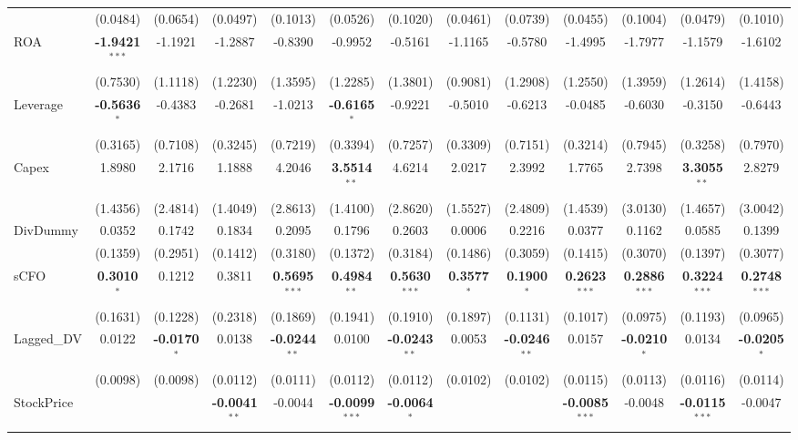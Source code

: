 \begin{landscape}
\begin{table}[H]
\begin{tabular}{lcccccccccccc}
 & (0.0484) & (0.0654) & (0.0497) & (0.1013) & (0.0526) & (0.1020) & (0.0461) & (0.0739) & (0.0455) & (0.1004) & (0.0479) & (0.1010) \\
ROA & \textbf{-1.9421}$^{***}$ & -1.1921 & -1.2887 & -0.8390 & -0.9952 & -0.5161 & -1.1165 & -0.5780 & -1.4995 & -1.7977 & -1.1579 & -1.6102 \\
 & (0.7530) & (1.1118) & (1.2230) & (1.3595) & (1.2285) & (1.3801) & (0.9081) & (1.2908) & (1.2550) & (1.3959) & (1.2614) & (1.4158) \\
Leverage & \textbf{-0.5636}$^{*}$ & -0.4383 & -0.2681 & -1.0213 & \textbf{-0.6165}$^{*}$ & -0.9221 & -0.5010 & -0.6213 & -0.0485 & -0.6030 & -0.3150 & -0.6443 \\
 & (0.3165) & (0.7108) & (0.3245) & (0.7219) & (0.3394) & (0.7257) & (0.3309) & (0.7151) & (0.3214) & (0.7945) & (0.3258) & (0.7970) \\
Capex & 1.8980 & 2.1716 & 1.1888 & 4.2046 & \textbf{3.5514}$^{**}$ & 4.6214 & 2.0217 & 2.3992 & 1.7765 & 2.7398 & \textbf{3.3055}$^{**}$ & 2.8279 \\
 & (1.4356) & (2.4814) & (1.4049) & (2.8613) & (1.4100) & (2.8620) & (1.5527) & (2.4809) & (1.4539) & (3.0130) & (1.4657) & (3.0042) \\
DivDummy & 0.0352 & 0.1742 & 0.1834 & 0.2095 & 0.1796 & 0.2603 & 0.0006 & 0.2216 & 0.0377 & 0.1162 & 0.0585 & 0.1399 \\
 & (0.1359) & (0.2951) & (0.1412) & (0.3180) & (0.1372) & (0.3184) & (0.1486) & (0.3059) & (0.1415) & (0.3070) & (0.1397) & (0.3077) \\
sCFO & \textbf{0.3010}$^{*}$ & 0.1212 & 0.3811 & \textbf{0.5695}$^{***}$ & \textbf{0.4984}$^{**}$ & \textbf{0.5630}$^{***}$ & \textbf{0.3577}$^{*}$ & \textbf{0.1900}$^{*}$ & \textbf{0.2623}$^{***}$ & \textbf{0.2886}$^{***}$ & \textbf{0.3224}$^{***}$ & \textbf{0.2748}$^{***}$ \\
 & (0.1631) & (0.1228) & (0.2318) & (0.1869) & (0.1941) & (0.1910) & (0.1897) & (0.1131) & (0.1017) & (0.0975) & (0.1193) & (0.0965) \\
Lagged\_DV & 0.0122 & \textbf{-0.0170}$^{*}$ & 0.0138 & \textbf{-0.0244}$^{**}$ & 0.0100 & \textbf{-0.0243}$^{**}$ & 0.0053 & \textbf{-0.0246}$^{**}$ & 0.0157 & \textbf{-0.0210}$^{*}$ & 0.0134 & \textbf{-0.0205}$^{*}$ \\
 & (0.0098) & (0.0098) & (0.0112) & (0.0111) & (0.0112) & (0.0112) & (0.0102) & (0.0102) & (0.0115) & (0.0113) & (0.0116) & (0.0114) \\
StockPrice &  &  & \textbf{-0.0041}$^{**}$ & -0.0044 & \textbf{-0.0099}$^{***}$ & \textbf{-0.0064}$^{*}$ &  &  & \textbf{-0.0085}$^{***}$ & -0.0048 & \textbf{-0.0115}$^{***}$ & -0.0047 \\

\end{tabular}
\end{table}
\end{landscape}
